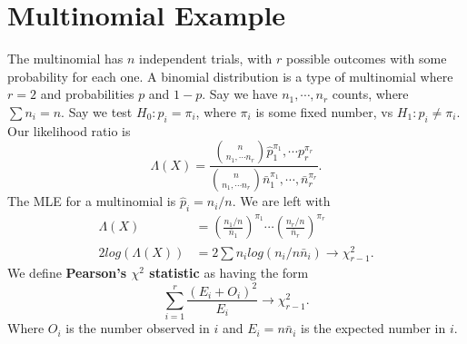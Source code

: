 \documentclass[titlepage, 12pt, leqno]{article}
\begin{document}
\pagebreak
\section{Multinomial Example}
The multinomial has $n$ independent trials, with $r$ possible outcomes with 
some probability for each one. A binomial distribution is a type of 
multinomial where $r=2$ and probabilities $p$ and $1-p$. Say we have
$n_{1}, \cdots ,n_{r}$ counts, where $\sum n_{i}=n$. Say we test
$H_{0}:p_{i}=\pi_{i}$, where $\pi_{i}$ is some fixed number, vs
$H_{1}:p_{i}\ne \pi_{i}$. Our likelihood ratio is
\[
\Lambda(X) = \frac{\binom{n}{n_{1}, \cdots n_{r}}\hat
p_{1}^{\pi_{1}}, \cdots p_{r}^{\pi_{r}}}{
\binom{n}{n_{1}, \cdots n_{r}}\bar n_{1}^{\pi_{1}}, \cdots ,
\bar n_{r}^{\pi_{r}}}.
\]
The MLE for a multinomial is $\hat p_{i} = n_{i}/n$. We are left with
\begin{align*}
    \Lambda(X)
    &= \left(\frac{n_{1}/n}{\bar n_{1}}\right)^{\pi_{1}} \cdots 
    \left(\frac{n_{r}/n}{\bar n_{r}}\right)^{\pi_{r}} \\
    2log(\Lambda(X))
    &= 2 \sum n_{i}log(n_{i}/n\bar n_{i}) \rightarrow \chi^{2}_{r-1}.
\end{align*}
We define \textbf{Pearson's $\chi^{2}$ statistic} as having the form
\[
    \sum_{i=1}^{r}\frac{(E_{i} + O_{i})^{2}}{E_{i}} \rightarrow \chi^{2}_{r-1}.
\]
Where $O_{i}$ is the number observed in $i$ and $E_{i}=n\bar n_{i}$ is the
expected number in $i$.
\end{document}
